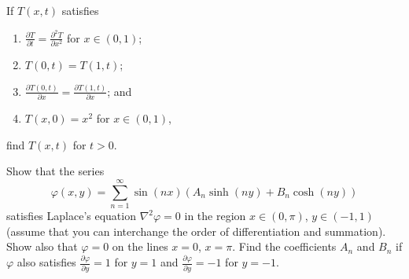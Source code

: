 
\setcounter{question}{112}
\question 
If $T(x,t)$ satisfies
\begin{enumerate}
    \item
        $\frac{\partial T}{\partial t} = \frac{\partial^2 T}{\partial x^2}$
        for $x \in (0,1)$;

    \item 
        $T(0,t) = T(1,t)$;

    \item 
        $\frac{\partial T(0,t)}{\partial x} = \frac{\partial T(1,t)}{\partial x}$; and

    \item
        $T(x,0) = x^2$ for $x \in (0,1)$,
\end{enumerate}
find $T(x,t)$ for $t > 0$.

\setcounter{question}{113}
\question
Show that the series
\[
    \varphi(x,y)
    = \sum^{\infty}_{n=1} \sin(nx) \left(A_n\sinh(ny) + B_n\cosh(ny)\right)
\]
satisfies Laplace's equation $\nabla^2\varphi = 0$ in the region
$x \in (0, \pi)$, $y \in (-1,1)$
(assume that you can interchange the order of differentiation and summation).
Show also that $\varphi = 0$ on the lines $x = 0$, $x = \pi$.
Find the coefficients $A_n$ and $B_n$ if $\varphi$ also
satisfies $\frac{\partial\varphi}{\partial y} = 1$ for $y = 1$
and $\frac{\partial \varphi}{\partial y} = -1$ for $y = -1$.
